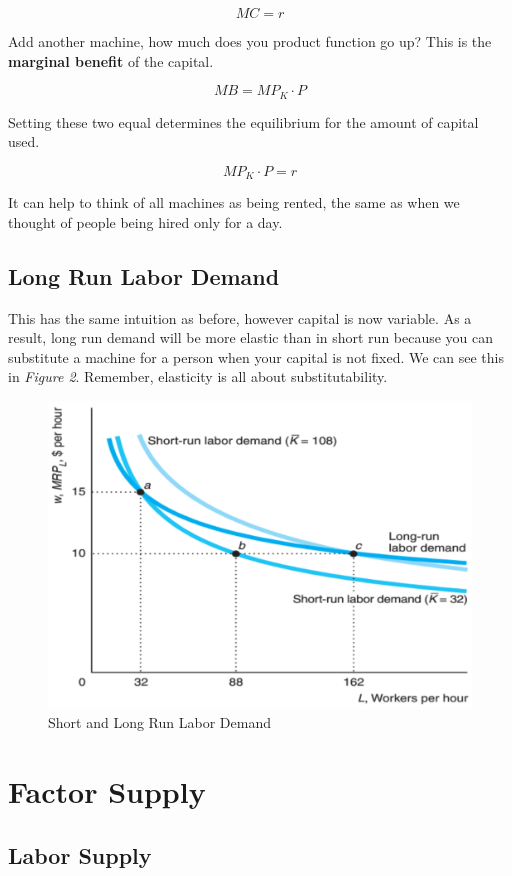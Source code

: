 \documentclass{article}
\begin{document}
$$MC=r$$

Add another machine, how much does you product function go up? This is the
\textbf{marginal benefit} of the capital.

$$MB=MP_{K}\cdot P$$

Setting these two equal determines the equilibrium for the amount of capital
used.

$$MP_{K}\cdot P=r$$

It can help to think of all machines as being rented, the same as when we
thought of people being hired only for a day. 

\subsection{Long Run Labor Demand}

This has the same intuition as before, however capital is now variable. As a
result, long run demand will be more elastic than in short run because you can
substitute a machine for a person when your capital is not fixed. We can see
this in \textit{Figure 2}. Remember, elasticity is all about substitutability. 

\begin{figure}[H]
    \centering
    \includegraphics[scale=0.33]{"Figure 16-2"}
    \caption{Short and Long Run Labor Demand}
\end{figure}

\section{Factor Supply}

\subsection{Labor Supply}
\end{document}
